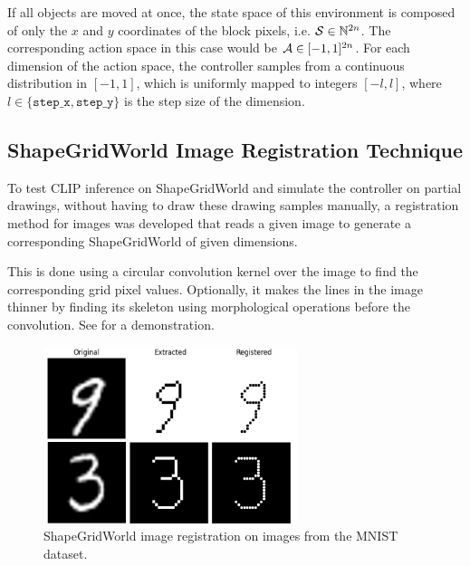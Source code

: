 If all objects are moved at once, the state space of this environment is composed of only the \(x\) and \(y\) coordinates of the block pixels, i.e. \(\mathcal{S} \in \mathbb{N}^{2 n}\).
The corresponding action space in this case would be \(\mathcal{A} \in [-1, 1]^{2 n}\).
For each dimension of the action space, the controller samples from a continuous distribution in \([-1, 1]\), which is uniformly mapped to integers \([-l, l]\), where \(l \in \{\texttt{step\_x}, \texttt{step\_y}\}\) is the step size of the dimension.

\subsection{ShapeGridWorld Image Registration Technique}
\label{sec:sgw-registration}

To test CLIP inference on ShapeGridWorld and simulate the controller on partial drawings, without having to draw these drawing samples manually, a registration method for images was developed that reads a given image to generate a corresponding ShapeGridWorld of given dimensions.

This is done using a circular convolution kernel over the image to find the corresponding grid pixel values.
Optionally, it makes the lines in the image thinner by finding its skeleton using morphological operations before the convolution.
See  for a demonstration.

\begin{figure}[H]
    \centering
    \includegraphics[width=0.66\textwidth]{images/grid_registration.png}
    \caption{ShapeGridWorld image registration on images from the MNIST dataset.}
    \label{fig:sgw-registration}
\end{figure}

